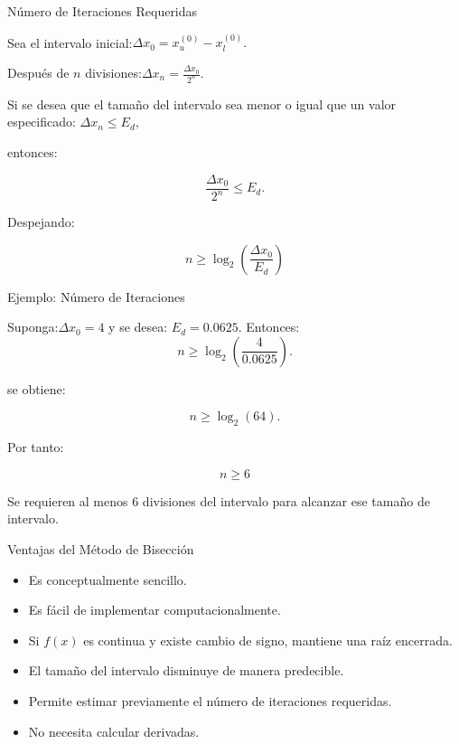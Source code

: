 \documentclass[../../main.tex]{subfiles}
\begin{document}

\begin{frame}{Número de Iteraciones Requeridas}

Sea el intervalo inicial:\(\Delta x_0
=
x_u^{(0)}
-
x_l^{(0)}.
\)

Después de \(n\) divisiones:\(
\Delta x_n
=
\frac{\Delta x_0}{2^n}.
\)

Si se desea que el tamaño del intervalo sea menor o igual que un valor especificado:
\(
\Delta x_n
\leq
E_d,
\)

entonces:

\[
\frac{\Delta x_0}{2^n}
\leq
E_d.
\]

Despejando:

\[
\boxed{
n
\geq
\log_2
\left(
\frac{\Delta x_0}{E_d}
\right)
}
\]

\end{frame}



\begin{frame}{Ejemplo: Número de Iteraciones}

Suponga:\(
\Delta x_0=4
\) y se desea: \(
E_d=0.0625.
\) Entonces:
\[
n
\geq
\log_2
\left(
\frac{4}{0.0625}
\right).
\]

se obtiene:

\[
n
\geq
\log_2(64).
\]

Por tanto:

\[
\boxed{
n\geq6
}
\]

Se requieren al menos 6 divisiones del intervalo para alcanzar ese tamaño de intervalo.

\end{frame}



\begin{frame}{Ventajas del Método de Bisección}

\begin{itemize}

    \item Es conceptualmente sencillo.

    \item Es fácil de implementar computacionalmente.

    \item Si \(f(x)\) es continua y existe cambio de signo, mantiene una raíz encerrada.

    \item El tamaño del intervalo disminuye de manera predecible.

    \item Permite estimar previamente el número de iteraciones requeridas.

    \item No necesita calcular derivadas.

\end{itemize}

\end{frame}
\end{document}
